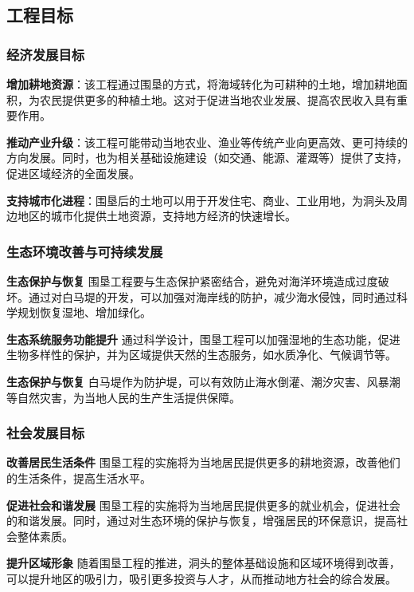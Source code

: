 \documentclass[UTF8, a4paper, 12pt]{ctexart} %
\begin{document}
\subsection{工程目标}
\subsubsection{经济发展目标}
\textbf{增加耕地资源}：该工程通过围垦的方式，将海域转化为可耕种的土地，增加耕地面积，为农民提供更多的种植土地。这对于促进当地农业发展、提高农民收入具有重要作用。
\par \textbf{推动产业升级}：该工程可能带动当地农业、渔业等传统产业向更高效、更可持续的方向发展。同时，也为相关基础设施建设（如交通、能源、灌溉等）提供了支持，促进区域经济的全面发展。
\par \textbf{支持城市化进程}：围垦后的土地可以用于开发住宅、商业、工业用地，为洞头及周边地区的城市化提供土地资源，支持地方经济的快速增长。

\subsubsection{生态环境改善与可持续发展}
\textbf{生态保护与恢复}
围垦工程要与生态保护紧密结合，避免对海洋环境造成过度破坏。通过对白马堤的开发，可以加强对海岸线的防护，减少海水侵蚀，同时通过科学规划恢复湿地、增加绿化。
\par \textbf{生态系统服务功能提升}
通过科学设计，围垦工程可以加强湿地的生态功能，促进生物多样性的保护，并为区域提供天然的生态服务，如水质净化、气候调节等。
\par \textbf{生态保护与恢复}
白马堤作为防护堤，可以有效防止海水倒灌、潮汐灾害、风暴潮等自然灾害，为当地人民的生产生活提供保障。
\subsubsection{社会发展目标}
\par \textbf{改善居民生活条件}
围垦工程的实施将为当地居民提供更多的耕地资源，改善他们的生活条件，提高生活水平。
\par \textbf{促进社会和谐发展}
围垦工程的实施将为当地居民提供更多的就业机会，促进社会的和谐发展。同时，通过对生态环境的保护与恢复，增强居民的环保意识，提高社会整体素质。
\par \textbf{提升区域形象}
随着围垦工程的推进，洞头的整体基础设施和区域环境得到改善，可以提升地区的吸引力，吸引更多投资与人才，从而推动地方社会的综合发展。
\end{document}
